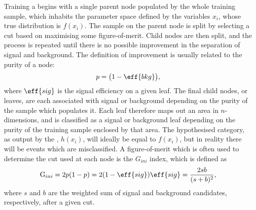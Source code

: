 Training a \DT begins with a single parent node populated by the whole
training sample, which inhabits the parameter space defined by the
variables $x_i$, whose true distribution is $f(x_i)$.
The sample on the parent node is split by selecting a cut based on maximising some figure-of-merit.
Child nodes are then split, and the process is repeated
until there is no possible improvement in the separation of signal and background.
The definition of improvement is usually related to the purity of a node:
\begin{equation}
  p = \big(1-\eff{bkg}\big),
\end{equation}
where $\eff{sig}$ is the signal efficiency on a given leaf.
The final child nodes, or leaves, are each associated with signal or background depending on the
purity of the sample which populates it.
Each leaf therefore maps out an area in $n$-dimensions, and is classified as a signal or background
leaf
depending on the purity of the training sample enclosed by that area.
The hypothesised category, as output by the \DT, $h(x_i)$, will ideally be equal to $f(x_i)$, but in reality there will be
events which are misclassified.
A figure-of-merit which is often used to determine the cut used at each node is the $G_{ini}$
index, which is defined as
\begin{equation}
  \mathrm{G}_{ini} = 2p(1-p)
  = 2(1-\eff{sig})\eff{sig}
  = \frac{2sb}{(s+b)^2},
\end{equation}
where $s$ and $b$ are the weighted sum of signal and background candidates, respectively, after a
given cut.

